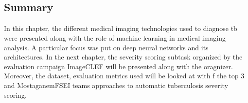 \subsection*{Summary}
\paragraph{}
In this chapter, the different medical imaging technologies used to diagnose \acs{tb} were presented along with the role of machine learning in medical imaging analysis. A particular focus was put on deep neural networks and its architectures. In the next chapter, the severity scoring subtask organized by the evaluation campaign ImageCLEF will be presented along with the oragnizer. Moreover, the dataset, evaluation metrics used will be looked at with f the top 3 and MostaganemFSEI teams approaches to automatic tuberculosis severity scoring.